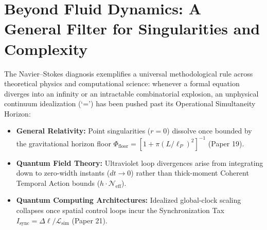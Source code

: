 \documentclass[11pt,a4paper]{article}
\begin{document}
\section{Beyond Fluid Dynamics: A General Filter for Singularities and Complexity}
The Navier--Stokes diagnosis exemplifies a universal methodological rule across theoretical physics and computational science: whenever a formal equation diverges into an infinity or an intractable combinatorial explosion, an unphysical continuum idealization (`=') has been pushed past its Operational Simultaneity Horizon:
\begin{itemize}
  \item \textbf{General Relativity:} Point singularities ($r = 0$) dissolve once bounded by the gravitational horizon floor $\Phi_{\text{floor}} = [1 + \pi(L/\ell_P)^2]^{-1}$ (Paper 19).
  \item \textbf{Quantum Field Theory:} Ultraviolet loop divergences arise from integrating down to zero-width instants ($dt \to 0$) rather than thick-moment Coherent Temporal Action bounds ($h \cdot \mathcal{N}_{\text{eff}}$).
  \item \textbf{Quantum Computing Architectures:} Idealized global-clock scaling collapses once spatial control loops incur the Synchronization Tax $I_{\text{sync}} = \Delta\ell / \mathcal{L}_{\text{sim}}$ (Paper 21).
\end{itemize}
\end{document}
